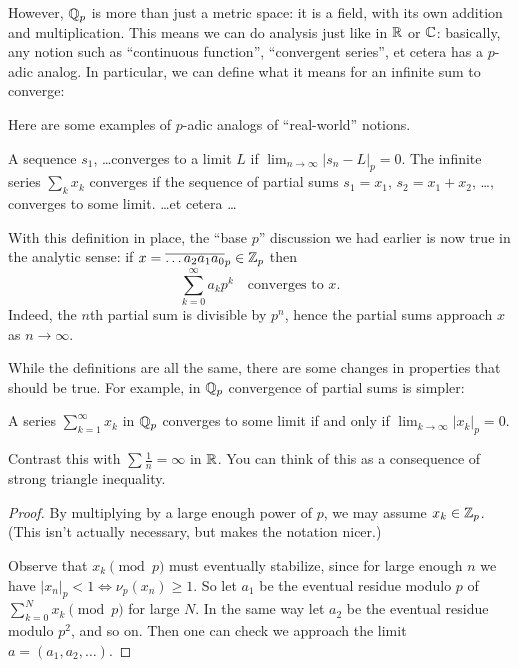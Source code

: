 However, $\mathbb Q_p$ is more than just a metric space:
it is a field, with its own addition and multiplication.
This means we can do analysis just like in $\mathbb R$ or $\mathbb C$:
basically, any notion such as ``continuous function'',
``convergent series'', et cetera has a $p$-adic analog.
In particular, we can define what it means for an infinite sum to converge:
\begin{definition}
	Here are some examples of $p$-adic analogs of ``real-world'' notions.
	\begin{itemize}
		\ii A sequence $s_1$, \dots converges to a limit $L$
		if $\lim_{n \to \infty} \left\lvert s_n - L \right\rvert_p = 0$.
		\ii The infinite series $\sum_k x_k$ converges
		if the sequence of partial sums $s_1 = x_1$,
		$s_2 = x_1 + x_2$, \dots, converges to some limit.
		\ii \dots et cetera \dots
	\end{itemize}
\end{definition}
With this definition in place,
the ``base $p$'' discussion we had earlier is now true
in the analytic sense: if $x = \overline{\dots a_2 a_1 a_0}_p \in \mathbb Z_p$ then
\[ \sum_{k=0}^\infty a_k p^k \quad\text{converges to } x. \]
Indeed, the $n$th partial sum is divisible by $p^n$,
hence the partial sums approach $x$ as $n \to \infty$.

While the definitions are all the same,
there are some changes in properties that should be true.
For example, in $\mathbb Q_p$ convergence of partial sums is simpler:
\begin{proposition}
	A series $\sum_{k=1}^\infty x_k$ in $\mathbb Q_p$
	converges to some limit if and only if
	$\lim_{k \to \infty} |x_k|_p = 0$.
	\label{noharmonic}
\end{proposition}
Contrast this with $\sum \frac1n = \infty$ in $\mathbb R$.
You can think of this as a consequence of strong triangle inequality.
\begin{proof}
	By multiplying by a large enough power of $p$,
	we may assume $x_k \in \mathbb Z_p$.
	(This isn't actually necessary, but makes the notation nicer.)

	Observe that $x_k \pmod p$ must eventually stabilize,
	since for large enough $n$ we have
	$\left\lvert x_n \right\rvert_p < 1 \iff \nu_p(x_n) \ge 1$.
	So let $a_1$ be the eventual residue modulo $p$
	of $\sum_{k=0}^N x_k \pmod p$ for large $N$.
	In the same way let $a_2$ be the eventual residue modulo $p^2$, and so on.
	Then one can check we approach the limit $a = (a_1, a_2, \dots)$.
\end{proof}

